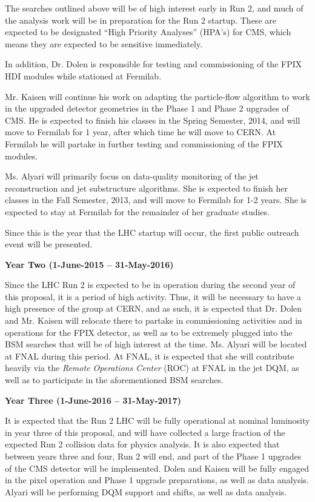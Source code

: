 \documentclass[12pt]{proposalnsf}
\begin{document}
The searches outlined above will be of high interest early in Run 2,
and much of the analysis work will be in preparation for the Run 2
startup. These are expected to be designated ``High Priority
Analyses'' (HPA's) for CMS, which means they are expected to be
sensitive immediately. 

In addition, Dr. Dolen is
responsible for testing and commissioning of the FPIX HDI
modules while stationed at Fermilab. 

Mr. Kaisen will continue his work on adapting the particle-flow
algorithm to work in the upgraded detector geometries in the Phase 1
and Phase 2 upgrades of CMS. He is expected to finish his classes in
the Spring Semester, 2014, and will move to Fermilab for 1 year,
after which time he will move to CERN. At Fermilab he will partake in
further testing and commissioning of the FPIX modules. 

Ms. Alyari will primarily focus on data-quality monitoring of the jet
reconstruction and jet substructure algorithms. She is expected to
finish her classes in the Fall Semester, 2013, and will move to
Fermilab for 1-2 years. She is expected to stay at Fermilab for the
remainder of her graduate studies. 




Since this is the year that the LHC startup will occur, 
the first public outreach event will be presented. 



\bigskip
\bigskip
{\bf \Large Year Two (1-June-2015 -- 31-May-2016)}
\bigskip


Since the LHC Run 2 is expected to be in operation during the second
year of this proposal, it is a period of high activity. Thus, it
will be necessary to have a high presence of the group at CERN, and
as such, it is expected that Dr. Dolen and
Mr. Kaisen will relocate there to partake in commissioning
activities and in operations for the FPIX detector, as well as to be
extremely plugged into the BSM searches that will be of high interest
at the time.
Ms. Alyari will be located at FNAL during this period. At FNAL, it is
expected that she will contribute heavily via the {\em Remote
  Operations Center} (ROC) at FNAL in the jet DQM, as well as to
participate in the aforementioned BSM searches. 



\bigskip
\bigskip
{\bf \Large Year Three (1-June-2016 -- 31-May-2017)}
\bigskip


It is expected that the Run 2 LHC will be fully
operational at nominal luminosity in year three of this proposal, and
will have collected a large fraction of the expected Run 2
collision data for physics analysis. 
It is also expected that between years three and four, Run 2
will end, and part of the Phase 1 upgrades of the CMS detector will be
implemented. 
Dolen and Kaisen will be fully
engaged in the pixel operation and Phase 1 upgrade preparations, as
well as data analysis. Alyari will be performing DQM support and
shifts, as well as data analysis. 
\end{document}
